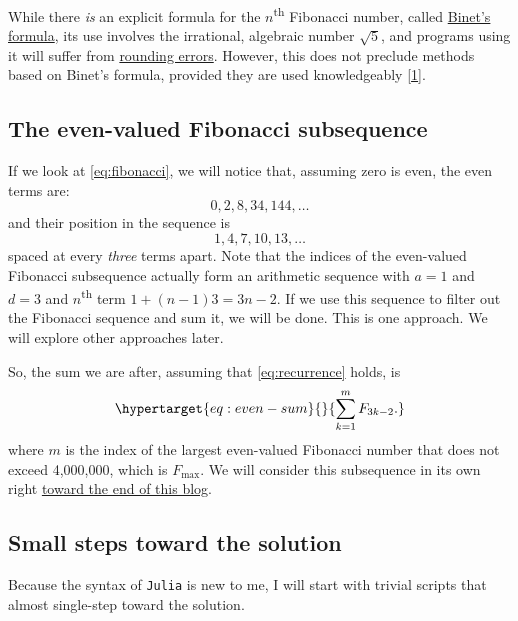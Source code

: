 \documentclass[
  a4paper,
]{article}
\begin{document}
While there \emph{is} an explicit formula for the
\(n\)\textsuperscript{th} Fibonacci number, called
\href{https://artofproblemsolving.com/wiki/index.php/Binet\%27s_Formula}{Binet's
formula}, its use involves the irrational, algebraic number \(\sqrt5\),
and programs using it will suffer from
\href{https://www.cs.drexel.edu/~popyack/Courses/CSP/Fa17/extras/Rounding/index.html}{rounding
errors}. However, this does not preclude methods based on Binet's
formula, provided they are used knowledgeably
{[}\protect\hyperlink{ref-julia-help}{1}{]}.

\hypertarget{the-even-valued-fibonacci-subsequence}{%
\subsection{The even-valued Fibonacci
subsequence}\label{the-even-valued-fibonacci-subsequence}}

If we look at \cref{eq:fibonacci}, we will notice that, assuming zero is
even, the even terms are: \[
0, 2, 8, 34, 144, \ldots
\] and their position in the sequence is \[
1, 4, 7, 10, 13, \ldots
\] spaced at every \emph{three} terms apart. Note that the indices of
the even-valued Fibonacci subsequence actually form an arithmetic
sequence with \(a = 1\) and \(d = 3\) and \(n\)\textsuperscript{th} term
\(1 + (n - 1)3 = 3n - 2\). If we use this sequence to filter out the
Fibonacci sequence and sum it, we will be done. This is one approach. We
will explore other approaches later.

So, the sum we are after, assuming that \cref{eq:recurrence} holds, is
\begin{equation}\protect\hypertarget{eq:even-sum}{}{
\sum_{k=1}^{m}F_{3k-2}.
}\label{eq:even-sum}\end{equation} where \(m\) is the index of the
largest even-valued Fibonacci number that does not exceed 4,000,000,
which is \(F_{\max}\). We will consider this subsequence in its own
right \protect\hyperlink{a-second-look-at-the-problem}{toward the end of
this blog}.

\hypertarget{small-steps-toward-the-solution}{%
\subsection{Small steps toward the
solution}\label{small-steps-toward-the-solution}}

Because the syntax of \texttt{Julia} is new to me, I will start with
trivial scripts that almost single-step toward the solution.
\end{document}

